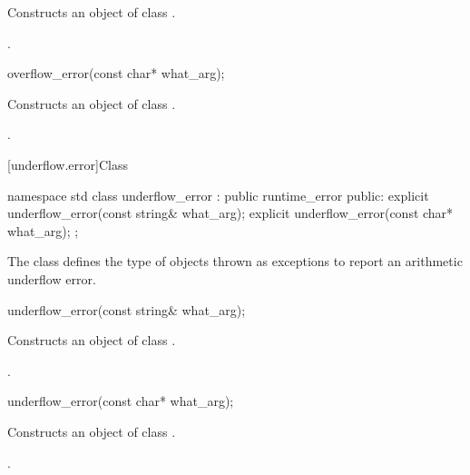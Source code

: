 \begin{itemdescr}
\pnum
\effects
Constructs an object of class
.

\pnum
\postcondition
{}.
\end{itemdescr}

%
\begin{itemdecl}
overflow_error(const char* what_arg);
\end{itemdecl}

\begin{itemdescr}
\pnum
\effects
Constructs an object of class
.

\pnum
\postcondition
{}.
\end{itemdescr}

[underflow.error]{Class }

%
\begin{codeblock}
namespace std {
  class underflow_error : public runtime_error {
  public:
    explicit underflow_error(const string& what_arg);
    explicit underflow_error(const char* what_arg);
  };
}
\end{codeblock}

\pnum
The class
defines the type of objects thrown as exceptions to report an arithmetic underflow error.

%
\begin{itemdecl}
underflow_error(const string& what_arg);
\end{itemdecl}

\begin{itemdescr}
\pnum
\effects
Constructs an object of class
.

\pnum
\postcondition
{}.
\end{itemdescr}

%
\begin{itemdecl}
underflow_error(const char* what_arg);
\end{itemdecl}

\begin{itemdescr}
\pnum
\effects
Constructs an object of class
.

\pnum
\postcondition
{}.
\end{itemdescr}

